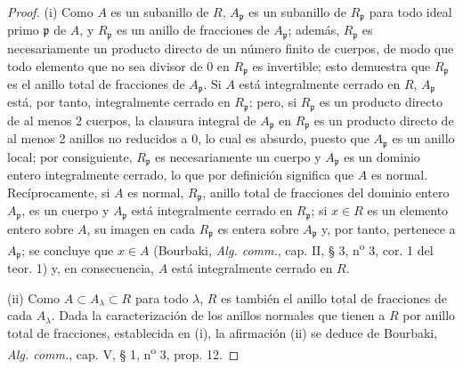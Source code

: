 \begin{proof}
(i) Como $A$ es un subanillo de $R$, $A_\mathfrak p$ es un subanillo
de $R_\mathfrak p$ para todo ideal primo $\mathfrak p$ de $A$, y
$R_\mathfrak p$ es un anillo de fracciones de $A_\mathfrak p$; además,
$R_\mathfrak p$ es necesariamente un producto directo de un número
finito de cuerpos, de modo que todo elemento que no sea divisor de
$0$ en $R_\mathfrak p$ es invertible; esto demuestra que
$R_\mathfrak p$ es el anillo total de fracciones de
$A_\mathfrak p$. Si $A$ está integralmente cerrado en $R$,
$A_\mathfrak p$ está, por tanto, integralmente cerrado en
$R_\mathfrak p$; pero, si $R_\mathfrak p$ es un producto directo de al
menos 2 cuerpos, la clausura integral de $A_\mathfrak p$ en
$R_\mathfrak p$ es un producto directo de al menos 2 anillos no
reducidos a $0$, lo cual es absurdo, puesto que $A_\mathfrak p$ es un
anillo local; por consiguiente, $R_\mathfrak p$ es necesariamente un
cuerpo y $A_\mathfrak p$ es un dominio entero integralmente cerrado,
lo que por definición significa que $A$ es normal. Recíprocamente,
si $A$ es normal, $R_\mathfrak p$, anillo total de fracciones del
dominio entero $A_\mathfrak p$, es un cuerpo y $A_\mathfrak p$ está
integralmente cerrado en $R_\mathfrak p$; si $x\in R$ es un elemento
entero sobre $A$, su imagen en cada $R_\mathfrak p$ es entera sobre
$A_\mathfrak p$ y, por tanto, pertenece a $A_\mathfrak p$; se concluye
que $x\in A$ (Bourbaki, \emph{Alg. comm.}, cap. II, § 3, n\textsuperscript{o} 3, cor. 1 del
teor. 1) y, en consecuencia, $A$ está integralmente cerrado en $R$.

(ii) Como $A\subset A_\lambda\subset R$ para todo $\lambda$, $R$ es
también el anillo total de fracciones de cada $A_\lambda$. Dada la
caracterización de los anillos normales que tienen a $R$ por anillo
total de fracciones, establecida en (i), la afirmación (ii) se deduce
de Bourbaki, \emph{Alg. comm.}, cap. V, § 1, n\textsuperscript{o} 3, prop. 12.
\end{proof}
